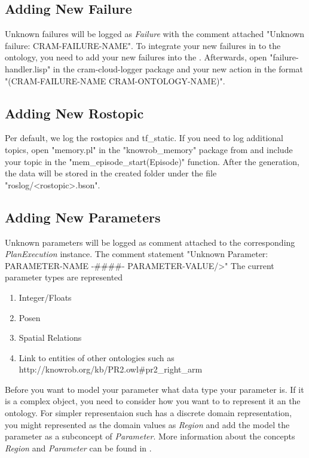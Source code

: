 \subsection{Adding New Failure}
Unknown failures will be logged as \textit{Failure} with the comment attached "Unknown failure: CRAM-FAILURE-NAME".
To integrate your new \cram failures in to the ontology, you need to add your new failures into the \cramOwl.
Afterwards, open "failure-handler.lisp" in the cram-cloud-logger package and your new action in the format "(CRAM-FAILURE-NAME CRAM-ONTOLOGY-NAME)".	

\subsection{Adding New Rostopic}
Per default, we log the rostopics \tf and tf\_static.
If you need to log additional topics, open "memory.pl" in the "knowrob\_memory" package from \knowrob and include your topic in the "mem\_episode\_start(Episode)" function.
After the \neem generation, the data will be stored in the created \neem folder under the file "roslog/<rostopic>.bson".

\subsection{Adding New Parameters}
Unknown parameters will be logged as comment attached to the corresponding \textit{PlanExecution} instance.
The comment statement "Unknown Parameter: PARAMETER-NAME  -\#\#\#\#- PARAMETER-VALUE/>"
The current parameter types are represented 


\begin{enumerate} 
	\item Integer/Floats
	\item Posen
	\item Spatial Relations
	\item Link to entities of other ontologies such as http://knowrob.org/kb/PR2.owl\#pr2\_right\_arm
\end{enumerate}

Before you want to model your parameter what data type your parameter is.
If it is a complex object, you need to consider how you want to to represent it an the ontology.
For simpler representaion such has a discrete domain representation, you might represented as the domain values as \textit{Region} and add the model the parameter as a subconcept of \textit{Parameter}.
More information about the concepts \textit{Region} and \textit{Parameter} can be found in .


